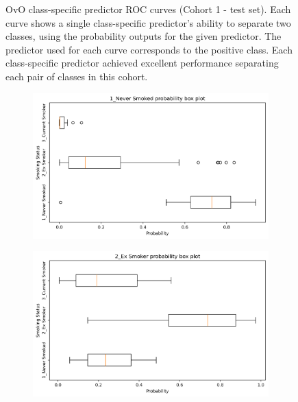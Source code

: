 \documentclass{article} %
\begin{document}
\begin{figure}[p]
\begin{subfigure}{0.46\linewidth}
    \end{subfigure}
    \caption[Class-specific predictor ROC curves (Cohort 1)]{OvO class-specific predictor ROC curves (Cohort 1 - test set). Each curve shows a single class-specific predictor's ability to separate two classes, using the probability outputs for the given predictor. The predictor used for each curve corresponds to the positive class. Each class-specific predictor achieved excellent performance separating each pair of classes in this cohort.}
    \label{fig:cohort1-initial-rocs}
\end{figure}

\begin{figure}[p]
    \centering
    \begin{subfigure}{0.75\linewidth}
        \centering
        \includegraphics[width=\linewidth]{cohort1/test_boxplot_1.png}
    \end{subfigure}
    \begin{subfigure}{0.75\linewidth}
        \centering
        \includegraphics[width=\linewidth]{cohort1/test_boxplot_2.png}

\end{subfigure}
\end{figure}
\end{document}
